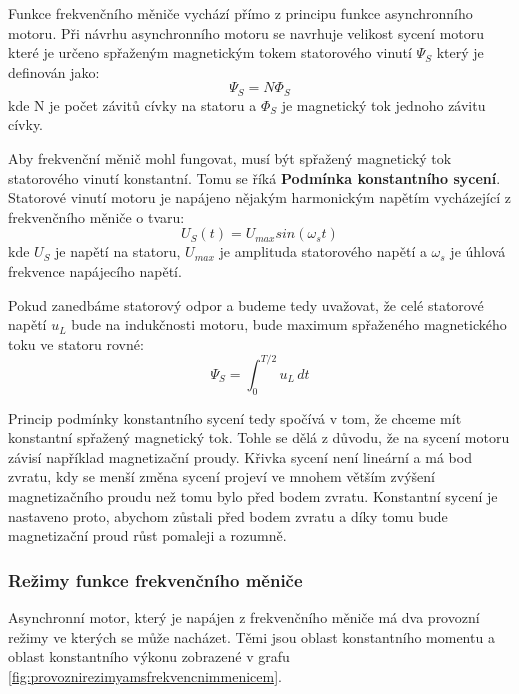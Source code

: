 Funkce frekvenčního měniče vychází přímo z principu funkce asynchronního motoru. Při návrhu asynchronního motoru se navrhuje velikost sycení motoru které je určeno spřaženým magnetickým tokem statorového vinutí $\Psi_S$ který je definován jako:
\begin{equation}
	\Psi_S = N\Phi_S
	\label{eq:SdruzenyMagnetickyTok}
\end{equation}
kde N je počet závitů cívky na statoru a $\Phi_S$ je magnetický tok jednoho závitu cívky.

Aby frekvenční měnič mohl fungovat, musí být spřažený magnetický tok statorového vinutí konstantní. Tomu se říká \textbf{Podmínka konstantního sycení}. Statorové vinutí motoru je napájeno nějakým harmonickým napětím vycházející z frekvenčního měniče o tvaru:
\begin{equation}
	U_S(t) = U_{max}sin(\omega_st)
	\label{eq:NapetiNaStatoru}
\end{equation}
kde $U_S$ je napětí na statoru, $U_{max}$ je amplituda statorového napětí a $\omega_s$ je úhlová frekvence napájecího napětí.
\cite{SkriptaRizeniOtacekAM}

Pokud zanedbáme statorový odpor a budeme tedy uvažovat, že celé statorové napětí $u_L$ bude na indukčnosti motoru, bude maximum spřaženého magnetického toku ve statoru rovné: \cite{SkriptaRizeniOtacekAM}
\begin{equation}
	\Psi_S = \int_0^{T/2} u_L \, dt
	\label{eq:PodminkaKonstantnihoSyceni}
\end{equation}


Princip podmínky konstantního sycení tedy spočívá v tom, že chceme mít konstantní spřažený magnetický tok. Tohle se dělá z důvodu, že na sycení motoru závisí například magnetizační proudy. Křivka sycení není lineární a má bod zvratu, kdy se menší změna sycení projeví ve mnohem větším zvýšení magnetizačního proudu než tomu bylo před bodem zvratu. Konstantní sycení je nastaveno proto, abychom zůstali před bodem zvratu a díky tomu bude magnetizační proud růst pomaleji a rozumně.

\subsubsection{Režimy funkce frekvenčního měniče}
Asynchronní motor, který je napájen z frekvenčního měniče má dva provozní režimy ve kterých se může nacházet. Těmi jsou oblast konstantního momentu a oblast konstantního výkonu zobrazené v grafu \ref{fig:provoznirezimyamsfrekvencnimmenicem}.

